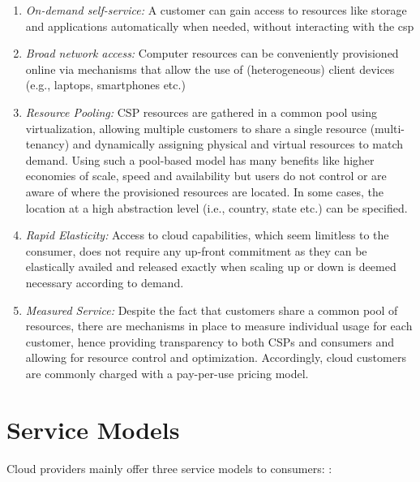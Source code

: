 \begin{enumerate} [I]
    \item \textit{On-demand self-service:} A customer can gain access to resources like storage and applications automatically when needed, without interacting with the \ac{csp} 

    \item \textit{Broad network access:} Computer resources can be conveniently provisioned online via mechanisms that allow the use of (heterogeneous) client devices (e.g., laptops, smartphones etc.)

    \item \textit{Resource Pooling:} CSP resources are gathered in a common pool using virtualization, allowing multiple customers to share a single resource (multi-tenancy) and dynamically assigning physical and virtual resources to match demand. Using such a pool-based model has many benefits like higher economies of scale, speed and availability but users do not control or are aware of where the provisioned resources are located. In some cases, the location at a high abstraction level (i.e., country, state etc.) can be specified.

    \item \textit{Rapid Elasticity:} Access to cloud capabilities, which seem limitless to the consumer, does not require any up-front commitment as they can be elastically availed and released exactly when scaling up or down is deemed necessary according to demand.

    \item \textit{Measured Service:} Despite the fact that customers share a common pool of resources, there are mechanisms in place to measure individual usage for each customer, hence providing transparency to both CSPs and consumers and allowing for resource control and optimization. Accordingly, cloud customers are commonly charged with a pay-per-use pricing model.
\end{enumerate}


\section{Service Models}
Cloud providers mainly offer three service models to consumers: \cite{nist,c2,c1}:


